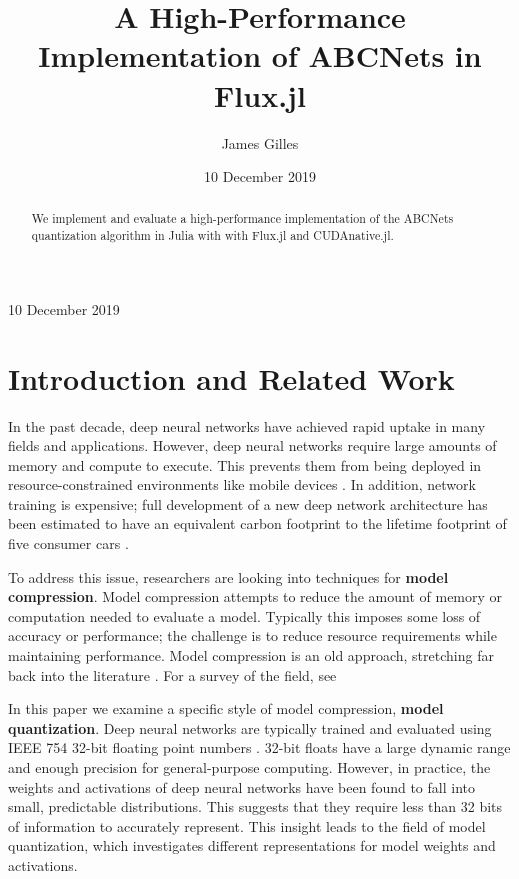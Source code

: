 \documentclass[12pt]{article}
\author{James Gilles}
\date{10 December 2019}
\title{A High-Performance Implementation of ABCNets in Flux.jl}
\renewcommand*{\tableofcontents}{}
\renewcommand*{\tableofcontents}[0]{}
\begin{document}
\maketitle
\tableofcontents

\begin{abstract}
We implement and evaluate a high-performance implementation of the ABCNets quantization algorithm in Julia with with Flux.jl and CUDAnative.jl.
\end{abstract}

10 December 2019

\section{Introduction and Related Work}
\label{sec:org5b781ec}

In the past decade, deep neural networks have achieved rapid uptake in many fields
and applications. However, deep neural networks require large amounts
of memory and compute to execute. This prevents them from being deployed in resource-constrained environments like mobile devices \citep{MobileNets}. In addition,
network training is expensive; full
development of a new deep network architecture has been estimated to have an equivalent
carbon footprint to the lifetime footprint of five consumer cars \citep{EmitCarbon}.

To address this issue, researchers are looking into techniques for \textbf{model compression}.
Model compression attempts to reduce the amount of memory or computation needed to evaluate a model. Typically this imposes some loss of accuracy or performance; the challenge is to
reduce resource requirements while maintaining performance.
Model compression is an old approach, stretching far back into the literature \citep{OptimalBrainDamage}. For a survey of the field, see \citep{CompressionSurvey}

In this paper we examine a specific style of model compression, \textbf{model quantization}. Deep neural networks are typically trained and evaluated using IEEE 754 32-bit floating point numbers \citep{IEEE754}. 32-bit floats have a large dynamic range and enough precision for general-purpose computing.
However, in practice, the weights and activations of deep neural networks have been found to fall into small, predictable distributions.
This suggests that they require less than 32 bits of information to accurately represent.
This insight leads to the field of model quantization, which investigates different representations for model weights and activations.
\end{document}
